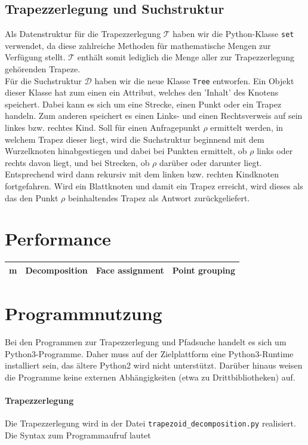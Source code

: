 \documentclass[11pt, a4paper]{article}
\newcommand{\T}{\ensuremath{\mathcal{T}} }
\newcommand{\D}{\ensuremath{\mathcal{D}} }
\begin{document}
\subsection{Trapezzerlegung und Suchstruktur}

Als Datenstruktur für die Trapezzerlegung \T haben wir die Python-Klasse \texttt{set} verwendet, da diese zahlreiche Methoden für mathematische Mengen zur Verfügung stellt. \T enthält somit lediglich die Menge aller zur Trapezzerlegung gehörenden Trapeze.\\
Für die Suchstruktur \D haben wir die neue Klasse \texttt{Tree} entworfen. Ein Objekt dieser Klasse hat zum einen ein Attribut, welches den 'Inhalt' des Knotens speichert. Dabei kann es sich um eine Strecke, einen Punkt oder ein Trapez handeln. Zum anderen speichert es einen Links- und einen Rechtsverweis auf sein linkes bzw. rechtes Kind. Soll für einen Anfragepunkt $\rho$ ermittelt werden, in welchem Trapez dieser liegt, wird die Suchstruktur beginnend mit dem Wurzelknoten hinabgestiegen und dabei bei Punkten ermittelt, ob $\rho$ links oder rechts davon liegt, und bei Strecken, ob $\rho$ darüber oder darunter liegt. Entsprechend wird dann rekursiv mit dem linken bzw. rechten Kindknoten fortgefahren. Wird ein Blattknoten und damit ein Trapez erreicht, wird dieses als das den Punkt $\rho$ beinhaltendes Trapez als Antwort zurückgeliefert.

\section{Performance}
\begin{tabular}{|c|c|c|c|}
	\hline
	m & Decomposition & Face assignment & Point grouping \\
	\hline
\end{tabular}

\section{Programmnutzung}
Bei den Programmen zur Trapezzerlegung und Pfadsuche handelt es sich um Python3-Programme. Daher muss auf der Zielplattform eine Python3-Runtime installiert sein, das ältere Python2 wird nicht unterstützt. Darüber hinaus weisen die Programme keine externen Abhängigkeiten (etwa zu Drittbibliotheken) auf.

\paragraph{Trapezzerlegung} Die Trapezzerlegung wird in der Datei \texttt{trapezoid\_decomposition.py} realisiert. Die Syntax zum Programmaufruf lautet
\end{document}
